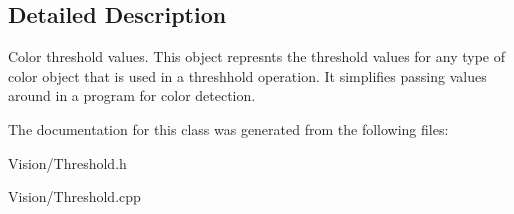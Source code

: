 \subsection{Detailed Description}
Color threshold values. This object represnts the threshold values for any type of color object that is used in a threshhold operation. It simplifies passing values around in a program for color detection. 

The documentation for this class was generated from the following files:\begin{DoxyCompactItemize}
\item 
Vision/Threshold.h\item 
Vision/Threshold.cpp\end{DoxyCompactItemize}
